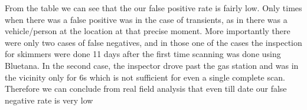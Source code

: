 From the table we can see that the our false positive rate is fairly low. Only times when there was a false positive was in the case of transients, as in there was a vehicle/person at the location at that precise moment. More importantly there were only two cases of false negatives, and in those one of the cases the inspection for skimmers were done 11 days after the first time scanning was done using Bluetana. In the second case, the inspector drove past the gas station and was in the vicinity only for 6s which is not sufficient for even a single complete scan. Therefore we can conclude from real field analysis that even till date our false negative rate is very low 


\begin{table}
\centering
\scriptsize
{}
\caption{Distribution of skimmers recovered by Bluetana by metropolitan area. Names of cities are not revealed but their populations have been mentioned.}
\label{tab:skimmer_chest}
\end{table}

